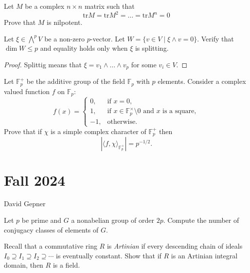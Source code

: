 \documentclass[openany]{book}
\newcommand{\tr}{\text{tr}}
\begin{document}
\begin{prob}[Q4]
    Let $M$ be a complex $n\times n$ matrix such that 
    \begin{equation*}
        \tr M=\tr M^2=\dots=\tr M^n=0
    \end{equation*}
    Prove that $M$ is nilpotent.
\end{prob}



\begin{prob}[Q5]
    Let \( \xi \in \bigwedge^p V \) be a non-zero \( p \)-vector. Let \( W = \{ v \in V \mid \xi \land v = 0 \} \). Verify that \(\dim W \leq p\) and equality holds only when \( \xi \) is splitting.
\end{prob}
\begin{proof}
    Splittig means that $\xi=v_1\wedge\dots\wedge v_p$ for some $v_i\in V$.
\end{proof}


\begin{prob}[Q6]
    Let \( \mathbb{F}_p^+ \) be the additive group of the field \( \mathbb{F}_p \) with \( p \) elements. Consider a complex valued function \( f \) on \( \mathbb{F}_p \):
\[
f(x) =
\begin{cases}
0, & \text{if } x = 0, \\
1, & \text{if } x \in \mathbb{F}_p^\times \setminus 0 \text{ and } x \text{ is a square}, \\
-1, & \text{otherwise}.
\end{cases}
\]
Prove that if \( \chi \) is a simple complex character of \( \mathbb{F}_p^+ \) then
\[
\left| \langle f, \chi \rangle_{\mathbb{F}_p^+} \right| = p^{-1/2}.
\]
\end{prob}

\chapter{Fall 2024}

David Gepner


\begin{prob}
    Let \( p \) be prime and \( G \) a nonabelian group of order \( 2p \). Compute the number of conjugacy classes of elements of \( G \).
\end{prob}


\begin{prob}
    Recall that a commutative ring \( R \) is \textit{Artinian} if every descending chain of ideals \( I_0 \supseteq I_1 \supseteq I_2 \supseteq \cdots \) is eventually constant. Show that if \( R \) is an Artinian integral domain, then \( R \) is a field.
\end{prob}
\end{document}
